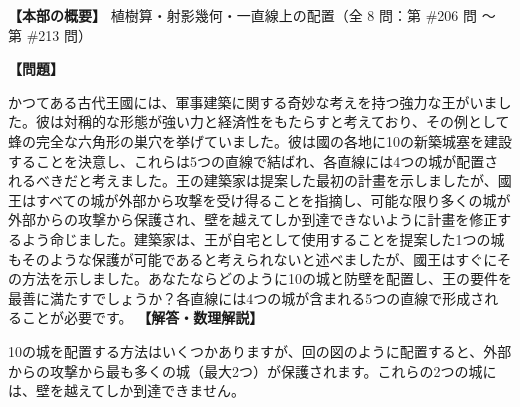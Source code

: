 \documentclass[10pt,a4paper,oneside,openany]{ltjsbook}
\begin{document}
\textbf{【本部の概要】} 植樹算・射影幾何・一直線上の配置（全 8 問：第 \#206 問 〜 第 \#213 問）

\vspace{1em}

\begin{tcolorbox}[colback=softblue,colframe=primaryblue,title=\textbf{第 206 問：王と城 （原題: THE KING AND THE CASTLES.）},arc=2mm,boxrule=1pt,breakable]
\textbf{【問題】}\par\vspace{0.3em}
かつてある古代王國には、軍事建築に関する奇妙な考えを持つ強力な王がいました。彼は対稱的な形態が強い力と経済性をもたらすと考えており、その例として蜂の完全な六角形の巣穴を挙げていました。彼は國の各地に10の新築城塞を建設することを決意し、これらは5つの直線で結ばれ、各直線には4つの城が配置されるべきだと考えました。王の建築家は提案した最初の計畫を示しましたが、國王はすべての城が外部から攻撃を受け得ることを指摘し、可能な限り多くの城が外部からの攻撃から保護され、壁を越えてしか到達できないように計畫を修正するよう命じました。建築家は、王が自宅として使用することを提案した1つの城もそのような保護が可能であると考えられないと述べましたが、國王はすぐにその方法を示しました。あなたならどのように10の城と防壁を配置し、王の要件を最善に満たすでしょうか？各直線には4つの城が含まれる5つの直線で形成されることが必要です。
\tcblower
\textbf{【解答・数理解説】}\par\vspace{0.3em}
10の城を配置する方法はいくつかありますが、回の図のように配置すると、外部からの攻撃から最も多くの城（最大2つ）が保護されます。これらの2つの城には、壁を越えてしか到達できません。
\end{tcolorbox}
\end{document}
